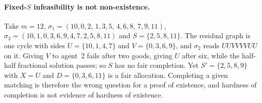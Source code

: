 \documentclass[sigconf,anonymous]{aamas}
\begin{document}
\paragraph{Fixed-$S$ infeasibility is not non-existence.}
Take $m=12$, $\sigma_1=(10,0,2,\,1,3,5,\,4,6,8,\,7,9,11)$, $\sigma_2=(10,1,0,3,6,9,4,7,2,5,8,11)$ and $S=\{2,5,8,11\}$. The residual graph is one cycle with sides $U=\{10,1,4,7\}$ and $V=\{0,3,6,9\}$, and $\sigma_2$ reads $UUVVVVUU$ on it. Giving $V$ to agent~2 fails after two goods, giving $U$ after six, while the half-half fractional solution passes; so $S$ has no fair completion. Yet $S'=\{2,5,8,9\}$ with $X=U$ and $D=\{0,3,6,11\}$ is a fair allocation. Completing a given matching is therefore the wrong question for a proof of existence, and hardness of completion is not evidence of hardness of existence.
\end{document}
